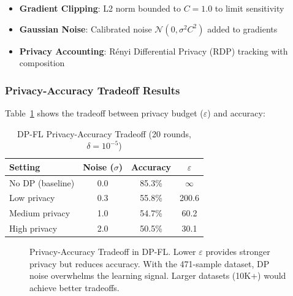 \documentclass[conference]{IEEEtran}
\begin{document}
\begin{itemize}
    \item \textbf{Gradient Clipping}: L2 norm bounded to $C = 1.0$ to limit sensitivity
    \item \textbf{Gaussian Noise}: Calibrated noise $\mathcal{N}(0, \sigma^2 C^2)$ added to gradients
    \item \textbf{Privacy Accounting}: R\'enyi Differential Privacy (RDP) tracking with composition
\end{itemize}

\subsubsection{Privacy-Accuracy Tradeoff Results}

Table~\ref{tab:dp_results} shows the tradeoff between privacy budget ($\varepsilon$) and accuracy:

\begin{table}[h]
\centering
\caption{DP-FL Privacy-Accuracy Tradeoff (20 rounds, $\delta = 10^{-5}$)}
\label{tab:dp_results}
\begin{tabular}{lccc}
\hline
\textbf{Setting} & \textbf{Noise ($\sigma$)} & \textbf{Accuracy} & \textbf{$\varepsilon$} \\
\hline
No DP (baseline) & 0.0 & 85.3\% & $\infty$ \\
Low privacy & 0.3 & 55.8\% & 200.6 \\
Medium privacy & 1.0 & 54.7\% & 60.2 \\
High privacy & 2.0 & 50.5\% & 30.1 \\
\hline
\end{tabular}
\end{table}

\begin{figure}[h]
\centering
{}
\caption{Privacy-Accuracy Tradeoff in DP-FL. Lower $\varepsilon$ provides stronger privacy but reduces accuracy. With the 471-sample dataset, DP noise overwhelms the learning signal. Larger datasets (10K+) would achieve better tradeoffs.}
\label{fig:privacy_tradeoff}
\end{figure}
\end{document}
